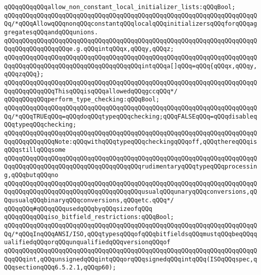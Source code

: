 \newline
\verb|qQQqqQQqqQQqallow_non_constant_local_initializer_lists:qQQqBool;|\newline
\verb|qQQqqQQqqQQqqQQqqQQqqQQqqQQqqQQqqQQqqQQqqQQqqQQqqQQqqQQqqQQqqQQqqQQqqQQq/*qQQqAllowqQQqnonqQQqconstantqQQqlocalqQQqinitializersqQQqforqQQqaggregatesqQQqandqQQqunions.|\newline
\verb|qQQqqQQqqQQqqQQqqQQqqQQqqQQqqQQqqQQqqQQqqQQqqQQqqQQqqQQqqQQqqQQqqQQqqQQqqQQqqQQqqQQqqQQqe.g.qQQqintqQQqx,qQQqy,qQQqz;|\newline
\verb|qQQqqQQqqQQqqQQqqQQqqQQqqQQqqQQqqQQqqQQqqQQqqQQqqQQqqQQqqQQqqQQqqQQqqQQqqQQqqQQqqQQqqQQqqQQqqQQqqQQqqQQqqQQqintqQQqa[]qQQq=qQQq{qQQqx,qQQqy,qQQqzqQQq};|\newline
\verb|qQQqqQQqqQQqqQQqqQQqqQQqqQQqqQQqqQQqqQQqqQQqqQQqqQQqqQQqqQQqqQQqqQQqqQQqqQQqqQQqqQQqThisqQQqisqQQqallowedqQQqgccqQQq*/|\newline
\verb|qQQqqQQqqQQqperform_type_checking:qQQqBool;|\newline
\verb|qQQqqQQqqQQqqQQqqQQqqQQqqQQqqQQqqQQqqQQqqQQqqQQqqQQqqQQqqQQqqQQqqQQqqQQq/*qQQqTRUEqQQq=qQQqdoqQQqtypeqQQqchecking;qQQqFALSEqQQq=qQQqdisableqQQqtypeqQQqchecking;|\newline
\verb|qQQqqQQqqQQqqQQqqQQqqQQqqQQqqQQqqQQqqQQqqQQqqQQqqQQqqQQqqQQqqQQqqQQqqQQqqQQqqQQqqQQqNote:qQQqwithqQQqtypeqQQqcheckingqQQqoff,qQQqthereqQQqisqQQqstillqQQqsome|\newline
\verb|qQQqqQQqqQQqqQQqqQQqqQQqqQQqqQQqqQQqqQQqqQQqqQQqqQQqqQQqqQQqqQQqqQQqqQQqqQQqqQQqqQQqqQQqqQQqqQQqqQQqqQQqqQQqrudimentaryqQQqtypeqQQqprocessing,qQQqbutqQQqno|\newline
\verb|qQQqqQQqqQQqqQQqqQQqqQQqqQQqqQQqqQQqqQQqqQQqqQQqqQQqqQQqqQQqqQQqqQQqqQQqqQQqqQQqqQQqqQQqqQQqqQQqqQQqqQQqqQQqusualqQQqunaryqQQqconversions,qQQqusualqQQqbinaryqQQqconversions,qQQqetc.qQQq*/|\newline
\newline
\verb|qQQqqQQq#qQQqqQQqusedqQQqbyqQQqsizeofqQQq|\newline
\verb|qQQqqQQqqQQqiso_bitfield_restrictions:qQQqBool;|\newline
\verb|qQQqqQQqqQQqqQQqqQQqqQQqqQQqqQQqqQQqqQQqqQQqqQQqqQQqqQQqqQQqqQQqqQQqqQQq/*qQQqInqQQqANSI/ISO,qQQqtypesqQQqofqQQqbitfieldsqQQqmustqQQqbeqQQqqualifiedqQQqorqQQqunqualifiedqQQqversionqQQqof|\newline
\verb|qQQqqQQqqQQqqQQqqQQqqQQqqQQqqQQqqQQqqQQqqQQqqQQqqQQqqQQqqQQqqQQqqQQqqQQqqQQqint,qQQqunsignedqQQqintqQQqorqQQqsignedqQQqintqQQq(ISOqQQqspec,qQQqsectionqQQq6.5.2.1,qQQqp60);|\newline
